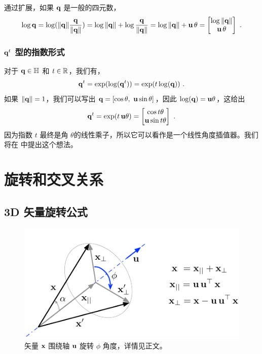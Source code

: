 通过扩展，如果 ${\bf q}$ 是一般的四元数，
%
\begin{align}
\log{\bf q} = \log({\left\|{\bf q}\right\|}\frac{{\bf q}}{{\left\|{\bf q}\right\|}}) = \log{\left\|{\bf q}\right\|} + \log\frac{{\bf q}}{{\left\|{\bf q}\right\|}} = \log{\left\|{\bf q}\right\|} + {\bf u}\,\theta = \begin{bmatrix}
\log{\left\|{\bf q}\right\|} \\ {\bf u}\,\theta
\end{bmatrix}
~.
\end{align}

\subsubsection{ ${\bf q}^t$ 型的指数形式}

对于 ${\bf q}\in{\mathbb H}$ 和 $t\in{\mathbb R}$，我们有，
%
\begin{align}
{\bf q}^t = \exp(\log({\bf q}^t)) = \exp(t\log({\bf q}))
~.
\end{align}
%
如果 ${\left\|{\bf q}\right\|}=1$，我们可以写出 ${\bf q}=[\cos\theta,~{\bf u}\sin\theta]$，因此 $\log({\bf q})={\bf u}\theta$，这给出
%
\begin{align}\label{equ:qa}
{\bf q}^t = \exp(t\,{\bf u}\theta)=\begin{bmatrix}
\cos t\theta \\
{\bf u}\sin t\theta
\end{bmatrix}
~.
\end{align}
%
因为指数 $t$ 最终是角 $\theta$的线性乘子，所以它可以看作是一个线性角度插值器。我们将在  中提出这个想法。

\section{旋转和交叉关系}
\label{sec:rotations}

\subsection{3D 矢量旋转公式}

\begin{figure}[htbp]
\centering
\includegraphics{figures/rotation3d}
\caption{矢量 ${\bf x}$ 围绕轴 ${\bf u}$ 旋转 $\phi$ 角度，详情见正文。}
\label{fig:rotation3d}
\end{figure}

